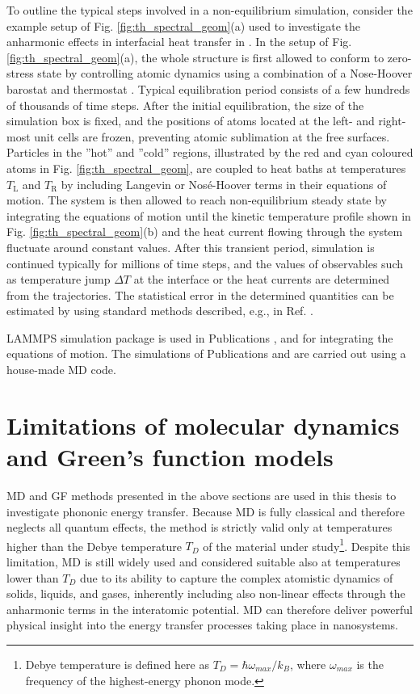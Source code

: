 To outline the typical steps involved in a non-equilibrium simulation, consider the example setup of Fig. \ref{fig:th_spectral_geom}(a) used to investigate the anharmonic effects in interfacial heat transfer in . In the setup of Fig. \ref{fig:th_spectral_geom}(a), the whole structure is first allowed to conform to zero-stress state by controlling atomic dynamics using a combination of a Nose-Hoover barostat and thermostat \cite{allentildesley}. Typical equilibration period consists of a few hundreds of thousands of time steps. After the initial equilibration, the size of the simulation box is fixed, and the positions of atoms located at the left- and right-most unit cells are frozen, preventing atomic sublimation at the free surfaces. Particles in the ''hot'' and ''cold'' regions, illustrated by the red and cyan coloured atoms in Fig. \ref{fig:th_spectral_geom}, are coupled to heat baths at temperatures $T_{\textrm{L}}$ and $T_{\textrm{R}}$ by including Langevin or Nos\'e-Hoover terms in their equations of motion. The system is then allowed to reach non-equilibrium steady state by integrating the equations of motion until the kinetic temperature profile shown in Fig. \ref{fig:th_spectral_geom}(b) and the heat current flowing through the system fluctuate around constant values. After this transient period, simulation is continued typically for millions of time steps, and the values of observables such as temperature jump $\Delta T$ at the interface or the heat currents are determined from the trajectories. The statistical error in the determined quantities can be estimated by using standard methods described, e.g., in Ref. \cite{allentildesley}.

LAMMPS simulation package \cite{plimpton95} is used in Publications ,  and  for integrating the equations of motion. The simulations of Publications  and  are carried out using a house-made MD code. 

\section{Limitations of molecular dynamics and Green's function models}
\label{sec:th_limits}
MD and GF methods presented in the above sections are used in this thesis to investigate phononic energy transfer. Because MD is fully classical and therefore neglects all quantum effects, the method is strictly valid only at temperatures higher than the Debye temperature $T_D$ of the material under study\footnote{Debye temperature is defined here as $T_D=\hbar \omega_{max}/k_B$, where $\omega_{max}$ is the frequency of the highest-energy phonon mode.}. Despite this limitation, MD is still widely used and considered suitable \cite{cahill14} also at temperatures lower than $T_D$ due to its ability to capture the complex atomistic dynamics of solids, liquids, and gases, inherently including also non-linear effects through the anharmonic terms in the interatomic potential. MD can therefore deliver powerful physical insight into the energy transfer processes taking place in nanosystems.

